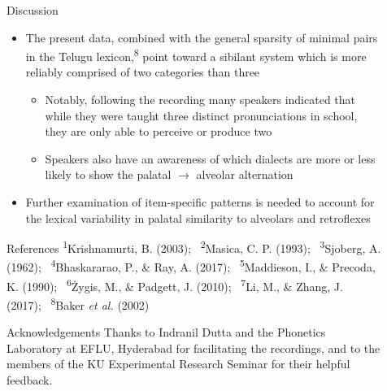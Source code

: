\documentclass[serif, mathserif, final, xcolor=table]{beamer}
\newcommand{\ssref}[1]{\textsuperscript{\color{blue}#1}}
\begin{document}
\begin{frame}[t]{}
\begin{columns}[t]
\begin{column}{0.72\linewidth}
\begin{columns}[t]
\begin{column}{0.485\linewidth}
        \end{column}


        \begin{column}{0.01\linewidth}        

        \end{column}

        \begin{column}{0.485\linewidth}

          \begin{block}{Discussion}
            \begin{itemize}
              \item The present data, combined with the general sparsity of minimal pairs in the Telugu lexicon,\ssref{8} point toward a sibilant system which is more reliably comprised of two categories than three
                \begin{itemize}
                  \item Notably, following the recording many speakers indicated that while they were taught three distinct pronunciations in school, they are only able to perceive or produce two
                  \item Speakers also have an awareness of which dialects are more or less likely to show the palatal $\rightarrow$ alveolar alternation
                \end{itemize}
              \item Further examination of item-specific patterns is needed to account for the lexical variability in palatal similarity to alveolars and retroflexes
            \end{itemize}
            
          \end{block}

          \begin{block}{References}
            \ssref{1}Krishnamurti, B. (2003);~ 
            \ssref{2}Masica, C. P. (1993);~ 
            \ssref{3}Sjoberg, A. (1962);~ 
            \ssref{4}Bhaskararao, P., \& Ray, A. (2017);~ 
            \ssref{5}Maddieson, I., \& Precoda, K. (1990);~
            \ssref{6}\.{Z}ygis, M., \& Padgett, J. (2010);~
            \ssref{7}Li, M., \& Zhang, J. (2017);~
            \ssref{8}Baker \textit{et al.} (2002)
          \end{block}
			\vspace{-1cm}
          \begin{block}{Acknowledgements}
            Thanks to Indranil Dutta and the Phonetics Laboratory at EFLU, Hyderabad for facilitating the recordings, and to the members of the KU Experimental Research Seminar for their helpful feedback.
          \end{block}


\end{column}
\end{columns}
\end{column}
\end{columns}
\end{frame}
\end{document}
